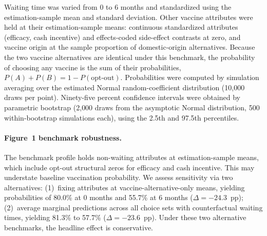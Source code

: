 Waiting time was varied from 0 to 6 months and standardized using the estimation-sample mean and standard deviation. Other vaccine attributes were held at their estimation-sample means: continuous standardized attributes (efficacy, cash incentive) and effects-coded side-effect contrasts at zero, and vaccine origin at the sample proportion of domestic-origin alternatives. Because the two vaccine alternatives are identical under this benchmark, the probability of choosing any vaccine is the sum of their probabilities, $P(A) + P(B) = 1 - P(\text{opt-out})$. Probabilities were computed by simulation averaging over the estimated Normal random-coefficient distribution (10{,}000 draws per point). Ninety-five percent confidence intervals were obtained by parametric bootstrap (2{,}000 draws from the asymptotic Normal distribution, 500 within-bootstrap simulations each), using the 2.5th and 97.5th percentiles.

\paragraph{Figure~1 benchmark robustness.} The benchmark profile holds non-waiting attributes at estimation-sample means, which include opt-out structural zeros for efficacy and cash incentive. This may understate baseline vaccination probability. We assess sensitivity via two alternatives: (1)~fixing attributes at vaccine-alternative-only means, yielding probabilities of 80.0\% at 0 months and 55.7\% at 6 months ($\Delta = -24.3$~pp); (2)~average marginal predictions across all choice sets with counterfactual waiting times, yielding 81.3\% to 57.7\% ($\Delta = -23.6$~pp). Under these two alternative benchmarks, the headline effect is conservative.
\clearpage
